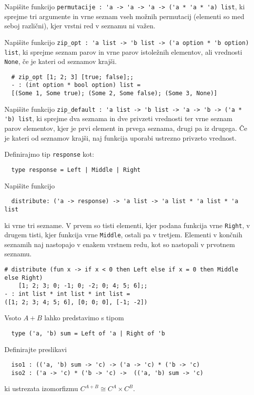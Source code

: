 \documentclass[arhiv]{../izpit}
\begin{document}
	


\naloga

\podnaloga
Napišite funkcijo \verb|permutacije : 'a -> 'a -> 'a -> ('a * 'a * 'a) list|, ki sprejme tri argumente in vrne seznam vseh možnih permutacij (elementi so med seboj različni), kjer vrstni red v seznamu ni važen.

\podnaloga
Napišite funkcijo \verb|zip_opt : 'a list -> 'b list -> ('a option * 'b option) list|, ki sprejme seznam parov in vrne parov istoležnih elementov, ali vrednosti \verb|None|, če je kateri od seznamov krajši.

\begin{verbatim}
  # zip_opt [1; 2; 3] [true; false];;
  - : (int option * bool option) list =
  [(Some 1, Some true); (Some 2, Some false); (Some 3, None)]
\end{verbatim}
  
\podnaloga
Napišite funkcijo \verb|zip_default : 'a list -> 'b list -> 'a -> 'b -> ('a * 'b) list|, ki sprejme dva seznama in dve privzeti vrednosti ter vrne seznam parov elementov, kjer je prvi element in prvega seznama, drugi pa iz drugega. Če je kateri od seznamov krajši, naj funkcija uporabi ustrezno privzeto vrednost.

\podnaloga
Definirajmo tip \verb|response| kot:
\begin{verbatim}
  type response = Left | Middle | Right
\end{verbatim}
Napišite funkcijo
\begin{verbatim}
  distribute: ('a -> response) -> 'a list -> 'a list * 'a list * 'a list
\end{verbatim}
ki vrne tri sezname. V prvem so tisti elementi, kjer podana funkcija vrne \verb|Right|, v drugem tisti, kjer funkcija vrne \verb|Middle|, ostali pa v tretjem. Elementi v končnih seznamih naj nastopajo v enakem vrstnem redu, kot so nastopali v prvotnem seznamu.

\begin{verbatim}
# distribute (fun x -> if x < 0 then Left else if x = 0 then Middle else Right) 
    [1; 2; 3; 0; -1; 0; -2; 0; 4; 5; 6];;
- : int list * int list * int list =
([1; 2; 3; 4; 5; 6], [0; 0; 0], [-1; -2])
\end{verbatim}

\podnaloga
Vsoto $A + B$ lahko predstavimo s tipom
\begin{verbatim}
  type ('a, 'b) sum = Left of 'a | Right of 'b
\end{verbatim}
Definirajte preslikavi
\begin{verbatim}
  iso1 : (('a, 'b) sum -> 'c) -> ('a -> 'c) * ('b -> 'c)
  iso2 : ('a -> 'c) * ('b -> 'c) ->  (('a, 'b) sum -> 'c)
\end{verbatim}
ki ustrezata izomorfizmu $C^{A + B} \cong C^A \times C^B$.
\end{document}
